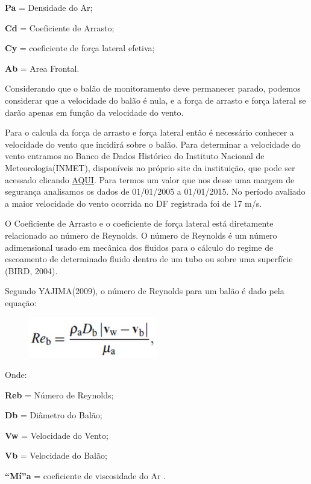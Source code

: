 	\textbf{Pa} = Densidade do Ar; 

	\textbf{Cd} = Coeficiente de Arrasto; 

	\textbf{Cy} = coeficiente de força lateral efetiva; 

	\textbf{Ab} = Area Frontal.

	Considerando que o balão de monitoramento deve permanecer parado, podemos considerar que a velocidade do balão é nula, e a força de arrasto e força lateral se darão apenas em função da velocidade do vento.
	
	Para o calcula da força de arrasto e força lateral então é necessário conhecer a velocidade do vento que incidirá sobre o balão. Para determinar a velocidade do vento entramos no Banco de Dados Histórico do Instituto Nacional de Meteorologia(INMET), disponíveis no próprio site da instituição, que pode ser acessado clicando \href{www.inmet.gov.br}{AQUI}. Para termos um valor que nos desse uma margem de segurança analisamos os dados de 01/01/2005 a 01/01/2015. No período avaliado a maior velocidade do vento ocorrida no DF registrada foi de 17 m/s.

	O Coeficiente de Arrasto e o coeficiente de força lateral está diretamente relacionado ao número de Reynolds. O número de Reynolds é um número adimensional usado em mecânica dos fluidos para o cálculo do regime de escoamento de determinado fluido dentro de um tubo ou sobre uma superfície (BIRD, 2004). 

	Segundo YAJIMA(2009), o número de Reynolds para um balão é dado pela equação:

	\begin{figure}[H]
		\centering
		\includegraphics[width=0.5\textwidth]{figuras/equacaoNumeroDeRey}
		\caption{}
		\label{img:equacaoNumeroDeRey}
	\end{figure}

	Onde: 

	\textbf{Reb} = Número de Reynolds; 

	\textbf{Db} = Diâmetro do Balão; 

	\textbf{Vw} = Velocidade do Vento; 

	\textbf{Vb} = Velocidade do Balão; 

	\textbf{“Mí”a} = coeficiente de viscosidade do Ar .

